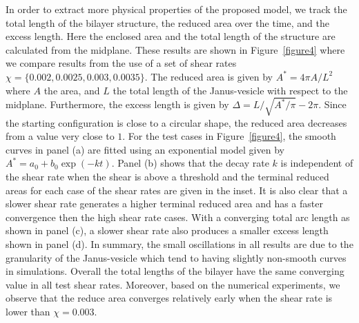 \documentclass[lineno]{jfm}
\begin{document}
In order to extract more physical properties of the proposed model, we track the total length of the bilayer structure, the reduced area over the time, and the excess length. Here the enclosed area and the total length of the structure are calculated from the midplane.
These results are shown in Figure~\ref{figure4} where we compare results from the use of a set of shear 
rates $\chi=\{0.002,0.0025,0.003,0.0035\}$. 
The reduced area is given by $A^* = 4\pi A/L^2$ where $A$ the area, and $L$ the total length of the Janus-vesicle with respect to the midplane. 
Furthermore, the excess length is given by $\Delta=L/\sqrt{A^*/\pi}-2\pi$.
Since the starting configuration is close to a circular shape, the reduced area decreases from a value very close to $1$. For the test cases in Figure~\ref{figure4}, the smooth curves in panel (a) are fitted using an
exponential model given by $A^* = a_0 + b_0 \exp(-kt)$. Panel (b) shows that the decay rate $k$ is independent of the shear rate when the shear is above a threshold and the terminal reduced areas for each 
case of the shear rates are given in the inset. It is also clear that a slower shear rate generates a higher terminal reduced area and has a faster convergence then the high shear rate cases. 
With a converging total arc length as shown in panel (c), a slower shear rate also produces a smaller excess length shown in panel (d).
In summary, the small oscillations in all results are due to the granularity of the Janus-vesicle which tend to having slightly non-smooth curves in simulations. Overall the total lengths of the bilayer have the same converging value in all test shear rates. Moreover, based on the numerical experiments, we observe that the reduce area converges relatively early when the shear rate is lower than $\chi=0.003$. 
\end{document}

